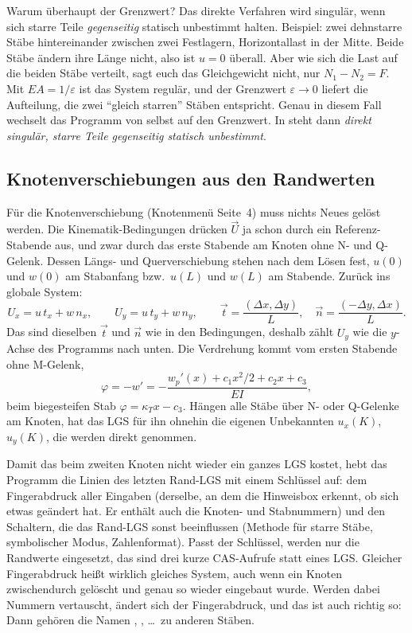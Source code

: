 Warum überhaupt der Grenzwert? Das direkte Verfahren wird singulär, wenn sich starre Teile
\emph{gegenseitig} statisch unbestimmt halten. Beispiel: zwei dehnstarre Stäbe hintereinander
zwischen zwei Festlagern, Horizontallast in der Mitte. Beide Stäbe ändern ihre Länge nicht, also
ist $u = 0$ überall. Aber wie sich die Last auf die beiden Stäbe verteilt, sagt euch das
Gleichgewicht nicht, nur $N_1 - N_2 = F$. Mit $EA = 1/\varepsilon$ ist das System regulär, und
der Grenzwert $\varepsilon \to 0$ liefert die Aufteilung, die zwei \enquote{gleich starren} Stäben
entspricht. Genau in diesem Fall wechselt das Programm von selbst auf den Grenzwert. In
 steht dann \emph{direkt singulär, starre Teile gegenseitig statisch unbestimmt}.

\subsection{Knotenverschiebungen aus den Randwerten}\label{sec:mathe-knotenverschiebung}

Für die Knotenverschiebung (Knotenmenü Seite~4) muss nichts Neues gelöst werden. Die
Kinematik-Bedingungen drücken $\vec U$ ja schon durch ein Referenz-Stabende aus, und zwar durch das erste
Stabende am Knoten ohne N- und Q-Gelenk. Dessen Längs- und Querverschiebung stehen nach dem Lösen
fest, $u(0)$ und $w(0)$ am Stabanfang bzw.\ $u(L)$ und $w(L)$ am Stabende. Zurück ins globale
System:
\[
  U_x = u\,t_x + w\,n_x, \qquad U_y = u\,t_y + w\,n_y, \qquad
  \vec t = \frac{(\Delta x, \Delta y)}{L}, \quad \vec n = \frac{(-\Delta y, \Delta x)}{L} .
\]
Das sind dieselben $\vec t$ und $\vec n$ wie in den Bedingungen, deshalb zählt $U_y$ wie die
$y$-Achse des Programms nach unten. Die Verdrehung kommt vom ersten Stabende ohne M-Gelenk,
\[
  \varphi = -w' = -\frac{w_p'(x) + c_1 x^2/2 + c_2 x + c_3}{EI},
\]
beim biegesteifen Stab $\varphi = \kappa_T x - c_3$. Hängen alle Stäbe über N- oder Q-Gelenke am
Knoten, hat das LGS für ihn ohnehin die eigenen Unbekannten $u_x(K)$, $u_y(K)$, die werden direkt
genommen.

Damit das beim zweiten Knoten nicht wieder ein ganzes LGS kostet, hebt das Programm die Linien des
letzten Rand-LGS mit einem Schlüssel auf: dem Fingerabdruck aller Eingaben (derselbe, an dem die
Hinweisbox erkennt, ob sich etwas geändert hat. Er enthält auch die Knoten- und Stabnummern) und
den Schaltern, die das Rand-LGS sonst beeinflussen (Methode für starre Stäbe, symbolischer Modus,
Zahlenformat). Passt der Schlüssel, werden nur die Randwerte eingesetzt, das sind drei kurze
CAS-Aufrufe statt eines LGS. Gleicher Fingerabdruck heißt wirklich gleiches System, auch wenn ein
Knoten zwischendurch gelöscht und genau so wieder eingebaut wurde. Werden dabei Nummern
vertauscht, ändert sich der Fingerabdruck, und das ist auch richtig so: Dann gehören die Namen
, , \dots\ zu anderen Stäben.

